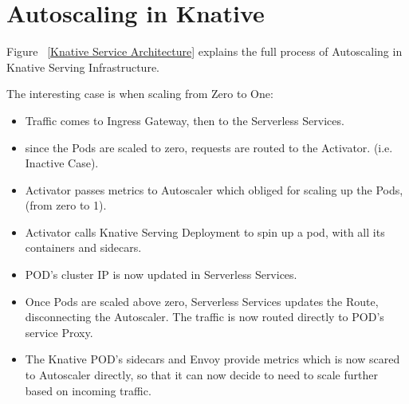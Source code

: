 \documentclass{article}
\begin{document}
\section{Autoscaling in Knative}
Figure ~\ref{Knative Service Architecture} explains the full process of Autoscaling in Knative Serving Infrastructure.
\begin{flushleft}
The interesting case is when scaling from Zero to One:
\begin{itemize}
\item  Traffic comes to Ingress Gateway, then to the Serverless Services.
\item since the Pods are scaled to zero, requests are routed to the Activator. (i.e. Inactive Case).
\item Activator passes metrics to Autoscaler which obliged for scaling up the Pods, (from zero to 1).
\item Activator calls Knative Serving Deployment to spin up a pod, with all its containers and sidecars. 
\item \gls{POD}'s cluster IP is now updated in Serverless Services.
\item Once Pods are scaled above zero, Serverless Services updates the Route, disconnecting the Autoscaler. The traffic is now routed directly to \gls{POD}'s service Proxy.
\item The Knative \gls{POD}'s sidecars and Envoy provide metrics which is now scared to Autoscaler directly, so that it can now decide to need to scale further based on incoming traffic.
\end{itemize}
\end{flushleft}
\end{document}
